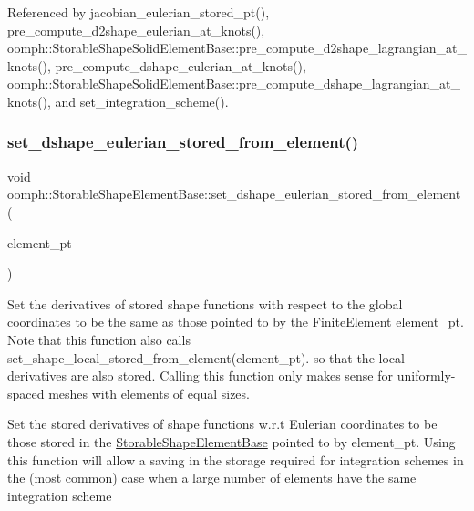 Referenced by jacobian\+\_\+eulerian\+\_\+stored\+\_\+pt(), pre\+\_\+compute\+\_\+d2shape\+\_\+eulerian\+\_\+at\+\_\+knots(), oomph\+::\+Storable\+Shape\+Solid\+Element\+Base\+::pre\+\_\+compute\+\_\+d2shape\+\_\+lagrangian\+\_\+at\+\_\+knots(), pre\+\_\+compute\+\_\+dshape\+\_\+eulerian\+\_\+at\+\_\+knots(), oomph\+::\+Storable\+Shape\+Solid\+Element\+Base\+::pre\+\_\+compute\+\_\+dshape\+\_\+lagrangian\+\_\+at\+\_\+knots(), and set\+\_\+integration\+\_\+scheme().

\mbox{\label{classoomph_1_1StorableShapeElementBase_aab18b96b6ef256e161033ec16e099fa4}} 
\subsubsection{\texorpdfstring{set\+\_\+dshape\+\_\+eulerian\+\_\+stored\+\_\+from\+\_\+element()}{set\_dshape\_eulerian\_stored\_from\_element()}}
{\footnotesize\ttfamily void oomph\+::\+Storable\+Shape\+Element\+Base\+::set\+\_\+dshape\+\_\+eulerian\+\_\+stored\+\_\+from\+\_\+element (\begin{DoxyParamCaption}\item[{\hyperlink{classoomph_1_1StorableShapeElementBase}{Storable\+Shape\+Element\+Base} $\ast$const \&}]{element\+\_\+pt }\end{DoxyParamCaption})}



Set the derivatives of stored shape functions with respect to the global coordinates to be the same as those pointed to by the \hyperlink{classoomph_1_1FiniteElement}{Finite\+Element} element\+\_\+pt. Note that this function also calls set\+\_\+shape\+\_\+local\+\_\+stored\+\_\+from\+\_\+element(element\+\_\+pt). so that the local derivatives are also stored. Calling this function only makes sense for uniformly-\/spaced meshes with elements of equal sizes. 

Set the stored derivatives of shape functions w.\+r.\+t Eulerian coordinates to be those stored in the \hyperlink{classoomph_1_1StorableShapeElementBase}{Storable\+Shape\+Element\+Base} pointed to by element\+\_\+pt. Using this function will allow a saving in the storage required for integration schemes in the (most common) case when a large number of elements have the same integration scheme 

